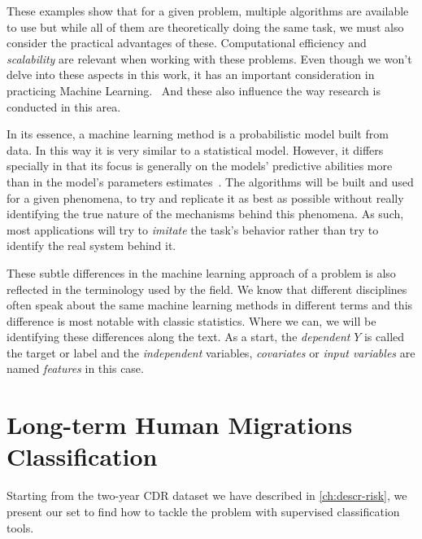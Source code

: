 These examples show that for a given problem, multiple algorithms are available to use but while all of them are theoretically doing the same task, we must also consider the practical advantages of these.
Computational efficiency and \textit{scalability} are relevant when working with these problems.
Even though we won't delve into these aspects in this work, it has an important consideration in practicing Machine Learning. \
And these also influence the way research is conducted in this area.


In its essence, a machine learning method is a probabilistic model built from data.
In this way it is very similar to a statistical model.
However, it differs specially in that its focus is generally on the models' predictive abilities more than in the model's parameters estimates~\textcite{breiman-statisticalmodeling}.
The algorithms will be built and used for a given phenomena, to try and replicate it as best as possible without really identifying the true nature of the mechanisms behind this phenomena.
As such, most applications will try to \textit{imitate} the task's behavior rather than try to identify the real system behind it.


These subtle differences in the machine learning approach of a problem is also reflected in the terminology used by the field.
We know that different disciplines often speak about the same machine learning methods in different terms and this difference is most notable with classic statistics.
Where we can, we will be identifying these differences along the text.
As a start, the \textit{dependent} $Y$ is called the target or label and the \textit{independent} variables, \textit{covariates} or \textit{input variables} are named \textit{features} in this case.

\section{Long-term Human Migrations Classification}\label{long_term}

Starting from the two-year CDR dataset we have described in \cref{ch:descr-risk}, we present our set to find how to tackle the problem with supervised classification tools.

